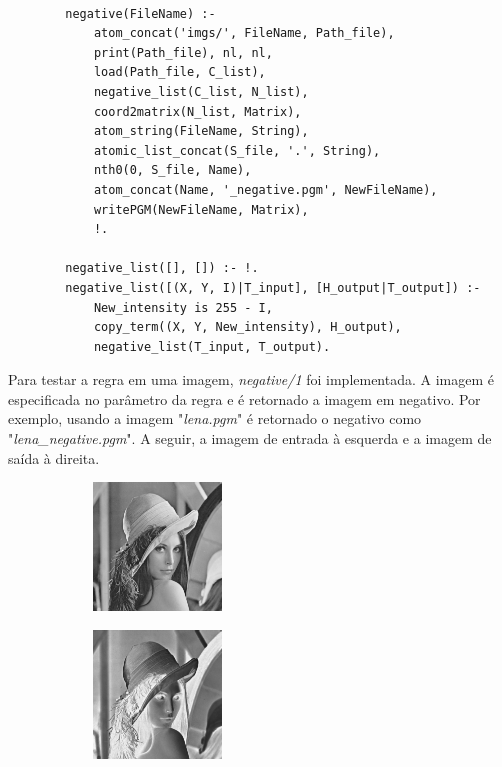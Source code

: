 \documentclass{article}
\begin{document}
        \begin{lstlisting}[frame=single] % Início da região de uso de trecho de código.

        negative(FileName) :-
            atom_concat('imgs/', FileName, Path_file),
            print(Path_file), nl, nl,
            load(Path_file, C_list),
            negative_list(C_list, N_list),
            coord2matrix(N_list, Matrix),
            atom_string(FileName, String),
            atomic_list_concat(S_file, '.', String),
            nth0(0, S_file, Name),
            atom_concat(Name, '_negative.pgm', NewFileName),
            writePGM(NewFileName, Matrix),
            !.
            
        negative_list([], []) :- !.
        negative_list([(X, Y, I)|T_input], [H_output|T_output]) :-
            New_intensity is 255 - I,
            copy_term((X, Y, New_intensity), H_output),
            negative_list(T_input, T_output).    
        \end{lstlisting}
        
        Para testar a regra em uma imagem, \textit{negative/1} foi implementada. A imagem é especificada no parâmetro da regra e é retornado a imagem em negativo. Por exemplo, usando a imagem "\textit{lena.pgm}" é retornado o negativo como "\textit{lena\_negative.pgm}". A seguir, a imagem de entrada à esquerda e a imagem de saída à direita.
        
        \begin{figure}[h]
        \centering
            \begin{subfigure}
            \centering
            \includegraphics[width=139px, height=129px]{images/lena.jpg}
            \end{subfigure}
            \begin{subfigure}
            \centering
            \includegraphics[width=139px, height=129px]{images/lena_negative.jpg}
            \end{subfigure}
        \end{figure}
        
\end{document}
